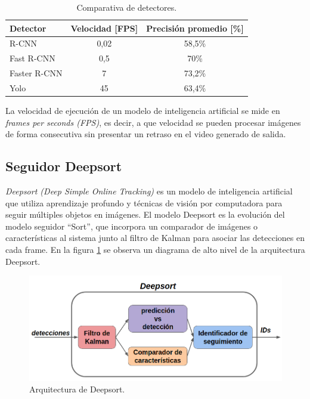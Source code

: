 \begin{table}[h]
	\centering
	\caption[Comparativa de detectores]{Comparativa de detectores.}
	\begin{tabular}{l c c}    
		\toprule
		\textbf{Detector}   & \textbf{Velocidad [FPS]} & \textbf{Precisión promedio [\%]} \\
		\midrule
		R-CNN & 0,02 & 58,5\% \\
		Fast R-CNN & 0,5 & 70\% \\
		Faster R-CNN & 7 & 73,2\% \\
		Yolo & 45 & 63,4\% \\
		\bottomrule
		\hline
	\end{tabular}
	\label{tab:comparativaDetectores}
\end{table}

La velocidad de ejecución de un modelo de inteligencia artificial se mide en \textit{frames per seconds (FPS)}, es decir, a que velocidad se pueden procesar imágenes de forma consecutiva sin presentar un retraso en el video generado de salida.

\subsection{Seguidor Deepsort}

\textit{Deepsort (Deep Simple Online Tracking)} es un modelo de inteligencia artificial que utiliza aprendizaje profundo y técnicas de visión por computadora para seguir múltiples objetos en imágenes. El modelo Deepsort es la evolución del modelo seguidor ``Sort'', que incorpora un comparador de imágenes o características al sistema junto al filtro de Kalman \citep{KALMAN_FILTER} para asociar las detecciones en cada frame. En la figura \ref{fig:deepsortArq} se observa un diagrama de alto nivel de la arquitectura Deepsort.

\begin{figure}[ht]
	\centering
	\includegraphics[scale=.55]{./Figures/deepsort.png}
	\caption{Arquitectura de Deepsort.}
	\label{fig:deepsortArq}
\end{figure}


